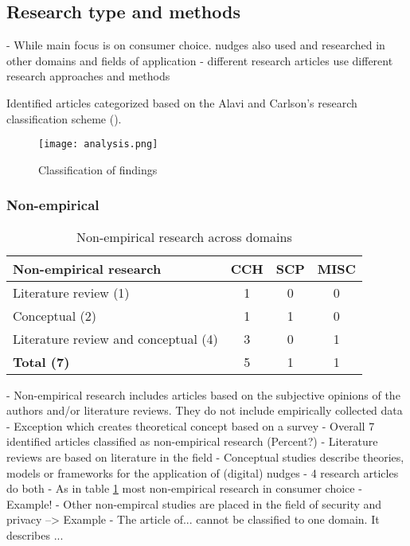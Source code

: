 
\subsection{Research type and methods}
- While main focus is on consumer choice. nudges also used and researched in other domains and fields of application
- different research articles use different research approaches and methods

Identified articles categorized based on the Alavi and Carlson's research classification scheme (\cite{alavi_review_1992}).



\begin{figure}[h!]
    \centering
    \texttt{[image: analysis.png]}
    \caption{Classification of findings}
    \label{fig:analysis}
\end{figure}


\subsubsection{Non-empirical}
\begin{table}[htbp]
\centering
\begin{tabular}{l|ccc}
\textbf{Non-empirical research} & \textbf{CCH} & \textbf{SCP} & \textbf{MISC} \\ \hline
Literature review (1) & 1 & 0 & 0 \\
Conceptual (2) & 1 & 1 & 0 \\
Literature review and conceptual (4) & 3 & 0 & 1 \\ \hline
\textbf{Total (7)} & 5 & 1 & 1
\end{tabular}
\caption{Non-empirical research across domains}
\label{table:non-empirical}
\end{table}

- Non-empirical research includes articles based on the subjective opinions of the authors and/or literature reviews. They do not include empirically collected data \cite{alavi_review_1992}
- Exception \cite{gamliel_average_2017} which creates theoretical concept based on a survey
- Overall 7 identified articles classified as non-empirical research (Percent?)
- Literature reviews are based on literature in the field
- Conceptual studies describe theories, models or frameworks for the application of (digital) nudges
- 4 research articles do both
- As in table \ref{table:non-empirical} most non-empirical research in consumer choice
- Example! 
- Other non-empircal studies are placed in the field of security and privacy --> Example
- The article of... cannot be classified to one domain. It describes ...


